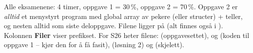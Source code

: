 

Alle eksamenene: 4 timer, oppgave 1 = 30\,\%, oppgave 2 = 70\,\%. Oppgave 2 er \emph{alltid} et menystyrt program med
global array av pekere (eller structer) + teller, og nesten alltid  som siste deloppgave.
Filene ligger på \href{https://frh.folk.ntnu.no/grprog/eksamen/}{} (alt finnes også i ).
Kolonnen \textbf{Filer} viser prefikset. For S26 heter filene:  (oppgavesettet),  og 
(koden til oppgave 1 -- kjør den for å få fasit),  (løsning 2) og  (skjelett).

